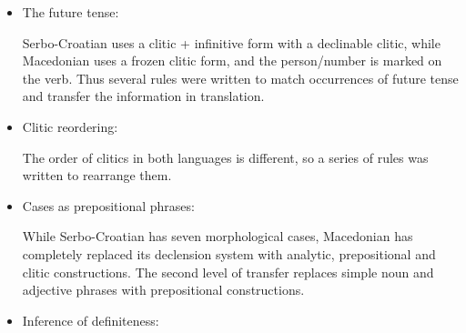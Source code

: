 \documentclass{book}
\begin{document}
\begin{itemize}
\item The future tense:

Serbo-Croatian uses a clitic + infinitive form with a declinable clitic, while
Macedonian uses a frozen clitic form, and the person/number is marked on the verb.
Thus several rules were written to match occurrences of future tense
and transfer the information in translation.

\pagebreak

\item Clitic reordering:

\nopagebreak


The order of clitics in both languages is different, so a series of rules was written to rearrange them.

\item Cases as prepositional phrases:


While Serbo-Croatian has seven morphological cases, Macedonian has 
completely replaced its declension system with analytic, prepositional and clitic constructions.
The second level of transfer replaces simple noun and adjective phrases with prepositional constructions.

\item Inference of definiteness:

\enumsentence{

}
\end{itemize}
\end{document}
